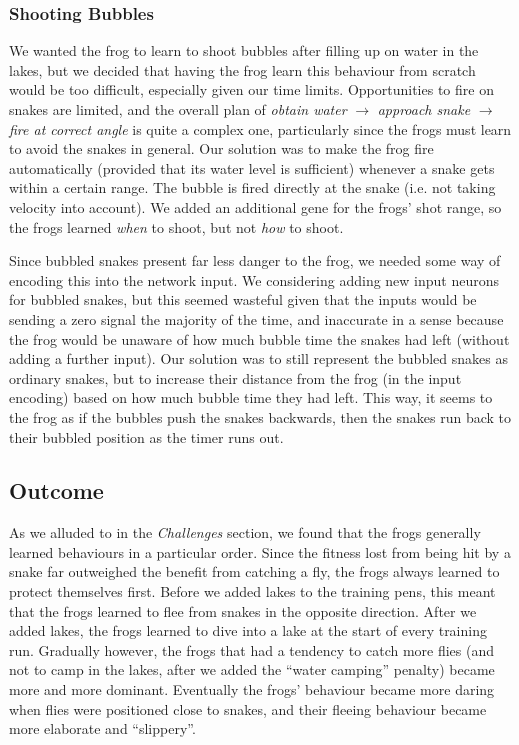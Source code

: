 \subsubsection{Shooting Bubbles}
\label{sec:bubbles}
We wanted the frog to learn to shoot bubbles after filling up on water in the lakes, but we decided that having the frog learn this behaviour from scratch would be too difficult, especially given our time limits. Opportunities to fire on snakes are limited, and the overall plan of \textit{obtain water} $\rightarrow$ \textit{approach snake} $\rightarrow$ \textit{fire at correct angle} is quite a complex one, particularly since the frogs must learn to avoid the snakes in general. Our solution was to make the frog fire automatically (provided that its water level is sufficient) whenever a snake gets within a certain range. The bubble is fired directly at the snake (i.e. not taking velocity into account). We added an additional gene for the frogs' shot range, so the frogs learned \textit{when} to shoot, but not \textit{how} to shoot.

Since bubbled snakes present far less danger to the frog, we needed some way of encoding this into the network input. We considering adding new input neurons for bubbled snakes, but this seemed wasteful given that the inputs would be sending a zero signal the majority of the time, and inaccurate in a sense because the frog would be unaware of how much bubble time the snakes had left (without adding a further input). Our solution was to still represent the bubbled snakes as ordinary snakes, but to increase their distance from the frog (in the input encoding) based on how much bubble time they had left. This way, it seems to the frog as if the bubbles push the snakes backwards, then the snakes run back to their bubbled position as the timer runs out.

\subsection{Outcome}
As we alluded to in the \textit{Challenges} section, we found that the frogs generally learned behaviours in a particular order. Since the fitness lost from being hit by a snake far outweighed the benefit from catching a fly, the frogs always learned to protect themselves first. Before we added lakes to the training pens, this meant that the frogs learned to flee from snakes in the opposite direction. After we added lakes, the frogs learned to dive into a lake at the start of every training run. Gradually however, the frogs that had a tendency to catch more flies (and not to camp in the lakes, after we added the ``water camping'' penalty) became more and more dominant. Eventually the frogs' behaviour became more daring when flies were positioned close to snakes, and their fleeing behaviour became more elaborate and ``slippery''.

